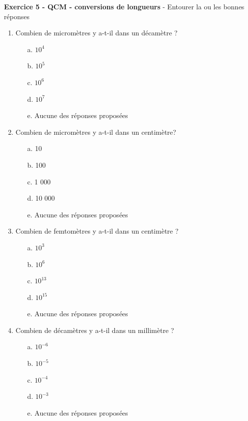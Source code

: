 \documentclass[11pt,a4paper]{article}
\begin{document}
\textbf{Exercice 5 - QCM - conversions de longueurs} -
Entourer la ou les bonnes réponses\\
\begin{multicols}{3}
\begin{enumerate}
\item Combien de micromètres y a-t-il dans un décamètre ?
\begin{enumerate}
\item[a.] $10^4$
\item[b.] $10^5$
\item[c.] $10^6$
\item[d.] $10^7$
\item[e.] Aucune des réponses proposées
\end{enumerate}



\item Combien de micromètres y a-t-il dans un centimètre?
\begin{enumerate}
\item[a.] 10
\item[b.] 100
\item[c.]  1 000
\item[d.] 10 000 
\item[e.] Aucune des réponses proposées
\end{enumerate}






\item Combien de femtomètres y a-t-il dans un centimètre ?
\begin{enumerate}
\item[a.] $10^3$
\item[b.] $10^6$
\item[c.] $10^{13}$
\item[d.] $10^{15}$
\item[e.] Aucune des réponses proposées
\end{enumerate}

\item Combien de décamètres y a-t-il dans un millimètre ?
\begin{enumerate}
\item[a.] $10^{-6}$
\item[b.] $10^{-5}$
\item[c.] $10^{-4}$
\item[d.] $10^{-3}$
\item[e.] Aucune des réponses proposées
\end{enumerate}


\end{enumerate}
\end{multicols}
\end{document}
